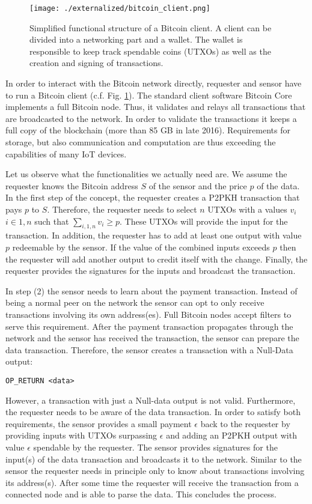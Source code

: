 \begin{figure}
\centering
\texttt{[image: ./externalized/bitcoin\_client.png]}
\caption{Simplified functional structure of a Bitcoin client. A client can be divided into a networking part and a wallet. The wallet is responsible to keep track spendable coins (\ac{UTXO}s) as well as the creation and signing of transactions.}
\label{fig:btcClient}
\end{figure}


In order to interact with the Bitcoin network directly, requester and sensor have to run a Bitcoin client (c.f. Fig. \ref{fig:btcClient}). The standard client software Bitcoin Core implements a full Bitcoin node. Thus, it validates and relays all transactions that are broadcasted to the network. In order to validate the transactions it keeps a full copy of the blockchain (more than 85 GB in late 2016). Requirements for storage, but also communication and computation are thus exceeding the capabilities of many \ac{IoT} devices.

Let us observe what the functionalities we actually need are. We assume the requester knows the Bitcoin address $S$ of the sensor and the price $p$ of the data. In the first step of the concept, the requester creates a \ac{P2PKH} transaction that pays $p$ to $S$. Therefore, the requester needs to select $n$ \ac{UTXO}s with a values $v_i$ $i \in {1,n}$ such that $\sum_{i,1,n}v_i\ge p$. These \ac{UTXO}s will provide the input for the transaction. In addition, the requester has to add at least one output with value $p$ redeemable by the sensor. If the value of the combined inputs exceeds $p$ then the requester will add another output to credit itself with the change. Finally, the requester provides the signatures for the inputs and broadcast the transaction.

In step (2) the sensor needs to learn about the payment transaction. Instead of being a normal peer on the network the sensor can opt to only receive transactions involving its own address(es). Full Bitcoin nodes accept filters to serve this requirement. After the payment transaction propagates through the network and the sensor has received the transaction, the sensor can prepare the data transaction. Therefore, the sensor creates a transaction with a Null-Data output:

\begin{lstlisting}
OP_RETURN <data>
\end{lstlisting}

However, a transaction with just a Null-data output is not valid. Furthermore, the requester needs to be aware of the data transaction. In order to satisfy both requirements, the sensor provides a small payment $\epsilon$ back to the requester by providing inputs with \ac{UTXO}s surpassing $\epsilon$ and adding an \ac{P2PKH} output with value $\epsilon$ spendable by the requester. The sensor provides signatures for the input(s) of the data transaction and broadcasts it to the network. Similar to the sensor the requester needs in principle only to know about transactions involving its address(s). After some time the requester will receive the transaction from a connected node and is able to parse the data. This concludes the process. 

